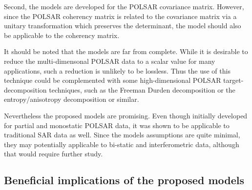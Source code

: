 Second, the models are developed for the POLSAR covariance matrix.
However, since the POLSAR coherency matrix is related to the covariance matrix via a unitary transformation which preserves the determinant,
  the model should also be applicable to the coherency matrix.

It should be noted that the models are far from complete.
While it is desirable to reduce the multi-dimensonal POLSAR data to a scalar value for many applications,
  such a reduction is unlikely to be lossless.  
Thus %
the use of this technique could be complemented with some high-dimensional POLSAR target-decomposition techniques, such as the Freeman Durden decomposition \cite{Freeman_1998_TGRS_963} or the entropy/anisotropy decomposition \cite{Cloude_1997_TGRS_68} or similar.

Nevertheless the proposed models are promising.
Even though initially developed for partial and monostatic POLSAR data,
  it was shown to be applicable to traditional SAR data as well.
Since the models assumptions are quite minimal, they may potentially applicable to bi-static and interferometric data, although that would require further study.

%
%

 \subsection{Beneficial implications of the proposed models}

